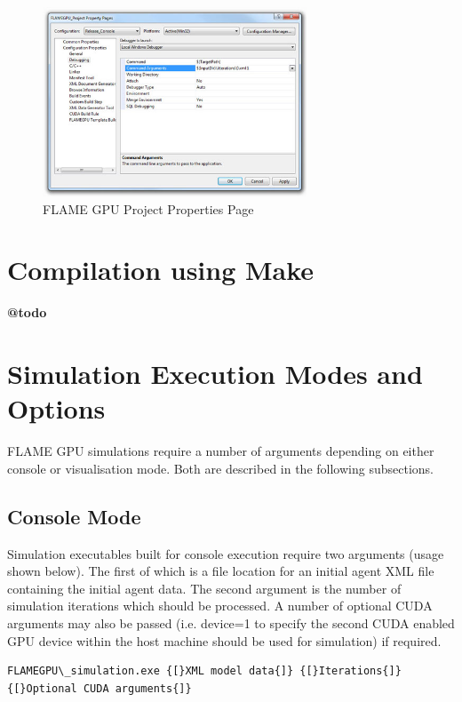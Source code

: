 \documentclass[11pt, a4paper, onecolumn, oneside]{report}
\begin{document}
\begin{figure}[ht]
    \centering
    \includegraphics[width=0.70\textwidth]{img/figure3}
    \caption{FLAME GPU Project Properties Page}
    \label{fig:project-properties-page}
\end{figure} 

\section{Compilation using Make}
\label{sec:compilation-makefile}

\textbf{@todo}

\section{Simulation Execution Modes and Options}
\label{sec:45}


FLAME GPU simulations require a number of arguments depending on either console or visualisation mode. Both are described in the following subsections.


\subsection{Console Mode}
\label{sec:451}


Simulation executables built for console execution require two arguments (usage shown below).
The first of which is a file location for an initial agent XML file containing the initial agent data.
The second argument is the number of simulation iterations which should be processed.
A number of optional CUDA arguments may also be passed (i.e.
device=1 to specify the second CUDA enabled GPU device within the host machine should be used for simulation) if required.

\begin{verbatim}
FLAMEGPU\_simulation.exe {[}XML model data{]} {[}Iterations{]} {[}Optional CUDA arguments{]}
\end{verbatim}
\end{document}
